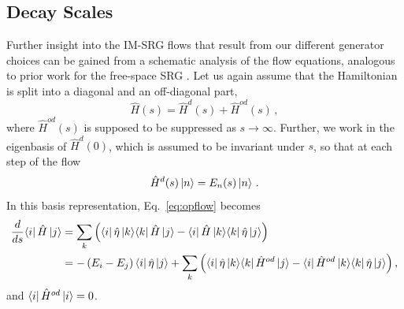 \subsection{\label{sec:scales}Decay Scales}
Further insight into the IM-SRG flows that result from our different generator choices can
be gained from a schematic analysis of the flow equations, analogous to prior work for
the free-space SRG \cite{anderson2008,bogner2010}.
Let us again assume that the Hamiltonian is split into a diagonal and an off-diagonal part,
\begin{equation}
  \hat{H}(s)=\hat{H}^d(s) + \hat{H}^{od}(s)\,,
\end{equation}
where $\hat{H}^{od}(s)$ is supposed to be suppressed as
$s\to\infty$. Further, we work in the eigenbasis of $\hat{H}^d(0)$,
which is assumed to be invariant under $s$, so that at each step of
the flow
\begin{equation}
  \hat{H}^d(s)\ket{n} = E_n(s)\ket{n}\,.
\end{equation}
In this basis representation, Eq.~\eqref{eq:opflow} becomes
\begin{align}
   \frac{d {}} {d {s}} \langle{i}|\,{\hat{H}}\,|{j}\rangle
  &=\sum_k\left(\langle{i}|\,{\hat{\eta}}\,|{k}\rangle\langle{k}|\,{\hat{H}}\,|{j}\rangle-\langle{i}|\,{\hat{H}}\,|{k}\rangle\langle{k}|\,{\hat{\eta}}\,|{j}\rangle\right)\notag\\
  &=-\left(E_i-E_j\right)\langle{i}|\,{\hat{\eta}}\,|{j}\rangle
    +\sum_k\left(\langle{i}|\,{\hat{\eta}}\,|{k}\rangle\langle{k}|\,{\hat{H}^{od}}\,|{j}\rangle-\langle{i}|\,{\hat{H}^{od}}\,|{k}\rangle\langle{k}|\,{\hat{\eta}}\,|{j}\rangle\right),
\end{align}
and $\langle{i}|\,{\hat{H}^{od}}\,|{i}\rangle=0$.


